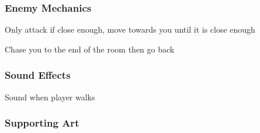 \documentclass{article}
\begin{document}
\subsubsection{Enemy Mechanics}
\begin{description}
\item Only attack if close enough, move towards you until it is close enough
\item Chase you to the end of the room then go back
\end{description}

\subsubsection{Sound Effects}
\begin{description}
\item Sound when player walks
\end{description}

\subsubsection{Supporting Art}
  \begin{figure}[!htb]
  \end{figure}

  \begin{figure}[!htb]
  \end{figure}
\end{document}
